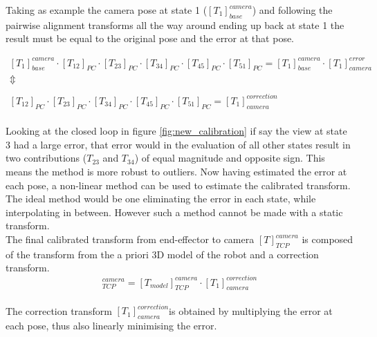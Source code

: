\noindent Taking as example the camera pose at state 1 ($ [T_1]_{base}^{camera} $) and following the pairwise alignment transforms all the way around ending up back at state 1 the result must be equal to the original pose and the error at that pose.

\begin{equation}
\begin{matrix}
[T_{1}]_{base}^{camera} \cdot [T_{12}]_{PC} \cdot [T_{23}]_{PC} \cdot [T_{34}]_{PC} \cdot [T_{45}]_{PC} \cdot [T_{51}]_{PC} = [T_{1}]_{base}^{camera} \cdot [T_{1}]_{camera}^{error}
\\ 
\Updownarrow \\ 
\\ 
[T_{12}]_{PC} \cdot [T_{23}]_{PC} \cdot [T_{34}]_{PC} \cdot [T_{45}]_{PC} \cdot [T_{51}]_{PC} = [T_{1}]_{camera}^{correction}
\end{matrix}
\end{equation}\\ 

\noindent Looking at the closed loop in figure \ref{fig:new_calibration} if say the view at state 3 had a large error, that error would in the evaluation of all other states result in two contributions ($ T_{23} $ and $ T_{34} $) of equal magnitude and opposite sign. This means the method is more robust to outliers. Now having estimated the error at each pose, a non-linear method can be used to estimate the calibrated transform. The ideal method would be one eliminating the error in each state, while interpolating in between. However such a method cannot be made with a static transform.\\

\noindent The final calibrated transform from end-effector to camera $[T]_{TCP}^{camera}$ is composed of the transform from the a priori 3D model of the robot and a correction transform. \\

\begin{equation}
[T]_{TCP}^{camera} = [T_{model}]_{TCP}^{camera} \cdot [T_1]_{camera}^{correction}
\end{equation}\\

The correction transform $[T_1]_{camera}^{correction}$is obtained by multiplying the error at each pose, thus also linearly minimising the error. \\




 



